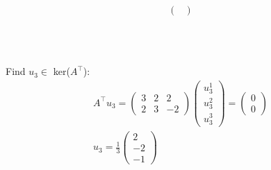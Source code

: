 \begin{frame}
{\begin{itemize}
\begin{columns}
\begin{column}{.5\textwidth}
\begin{align*}
\begin{pmatrix}
			\end{pmatrix}
			\end{align*}
		\end{column}
	\end{columns}
~\\~\\
Find $u_3\in$ ker($A^\top $):
\begin{align*}
A^\top u_3=\begin{pmatrix}
3&2&2\\2&3&-2
\end{pmatrix}\begin{pmatrix}
u_3^1\\u_3^2\\u_3^3
\end{pmatrix}=\begin{pmatrix}
0\\0
\end{pmatrix}\\
u_3=\frac{1}{3}\begin{pmatrix}
2\\-2\\-1
\end{pmatrix}
\end{align*}
\end{itemize}
}
\end{frame} 

